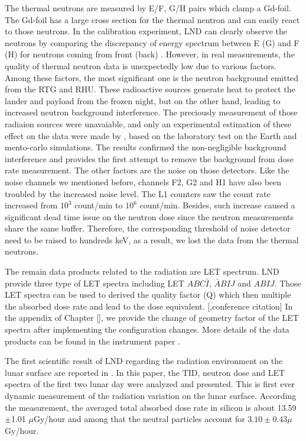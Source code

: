 The thermal neutrons are measured by E/F, G/H pairs which clamp a Gd-foil. The Gd-foil has a large cross section for the thermal nentron and can easily react to those neutrons. In the calibration experiment, \ac{LND} can clearly observe the neutrons by comparing the discrepancy of energy spectrum between E (G) and F (H) for neutrons coming from front (back) \citet{Wimmer2020SSRv}.
However, in real measurements, the quality of thermal neutron data is unexpectedly low due to various factors. Among these factors, the most significant one is the neutron background emitted from the \ac{RTG} and \ac{RHU}. These radioactive sources generate heat to protect the lander and payload from the frozen night, but on the other hand, leading to increased neutron background interference. The preciously measurement of those radiaion sources were unavaiable, and only an experimental estimation of these effect on the data were made by \citep{Hou2020-LNDbackground}, based on the laboratory test on the Earth and mento-carlo simulations. The results  confirmed the non-negligible background interference and provides the first attempt to remove the background from dose rate measurement. The other factors are the noise on those detectors. Like the noise channels we mentioned before, channels F2, G2 and H1 have also been troubled by the increased noise level. The L1 counters saw the count rate increased from $10^3$ count/min to $10^6$ count/min. Besides, such increase caused a significant dead time issue on the neutron dose since the neutron measurements share the same buffer. Therefore, the corresponding threshold of noise detector need to be raised to hundreds keV, as a result, we lost the data from the thermal neutrons.

The remain data products related to the radiation are \ac{LET} spectrum. \ac{LND} provide three type of \ac{LET} spectra including \ac{LET} $ABC\bar{I}$, $\bar{A}BIJ$ and $ABIJ$. Those \ac{LET} spectra can be used to derived the quality factor (Q) which then multiple the absorbed dose rate and lead to the dose equivalent. [,conference citation]
In the appendix of Chapter [], we provide the change of geometry factor of the LET spectra after implementing the configuration changes.
More details of the data products can be found in the instrument paper \citet{Wimmer2020SSRv}.

The first scientific result of \ac{LND} regarding the radiation environment on the lunar surface are reported in . In this paper, the \ac{TID}, neutron dose and \ac{LET} spectra of the first two lunar day were analyzed and presented. This is first ever dynamic measurement of the radiation variation on the lunar surface. According the measurement, the averaged total absorbed dose rate in silicon is about 13.59$\pm$1.01 $\mu$Gy/hour and among that the neutral particles account for $3.10 \pm 0.43 \mu$Gy/hour. 



